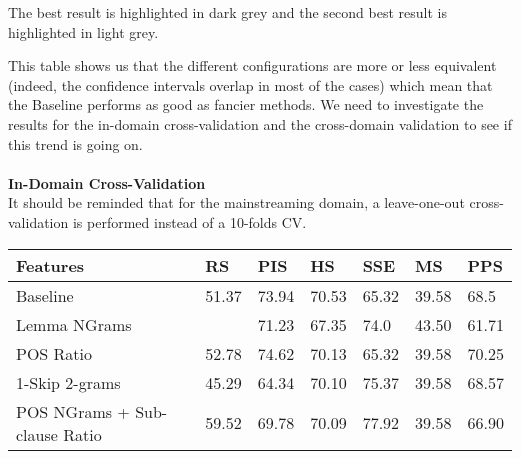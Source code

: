 The best result is highlighted in dark grey and the second best result is highlighted in light grey.

This table shows us that the different configurations are more or less equivalent (indeed, the confidence intervals overlap in most of the cases) which mean that the Baseline performs as good as fancier methods. We need to investigate the results for the in-domain cross-validation and the cross-domain validation to see if this trend is going on.
\\
\\
\textbf{In-Domain Cross-Validation}
\\
It should be reminded that for the mainstreaming domain, a leave-one-out cross-validation is performed instead of a 10-folds CV.
\begin{table}[h]
\begin{tabular}{|l|l|l|l|l|l|l|}
\hline
Features                           & RS                                                   & PIS                           & HS                            & SSE                           & MS                            & PPS                           \\ \hline
Baseline                           & 51.37                                                & 73.94                         & 70.53                         & 65.32                         & 39.58                         & 68.5                          \\ \hline
Lemma NGrams                       & \cellcolor[HTML]{C0C0C0}{\color[HTML]{000000} 55.89} & 71.23                         & 67.35                         & \cellcolor[HTML]{C0C0C0}74.0  & \cellcolor[HTML]{656565}43.50 & 61.71                         \\ \hline
POS Ratio                          & 52.78                                                & \cellcolor[HTML]{C0C0C0}74.62 & 70.13                         & 65.32                         & 39.58                         & 70.25                         \\ \hline
1-Skip 2-grams                     & 45.29                                                & 64.34                         & 70.10                         & 75.37                         & 39.58                         & 68.57                         \\ \hline
POS NGrams + Sub-clause Ratio      & \cellcolor[HTML]{656565}59.52                        & 69.78                         & 70.09                         & \cellcolor[HTML]{656565}77.92 & 39.58                         & 66.90                         \\ \hline

\end{tabular}
\end{table}
